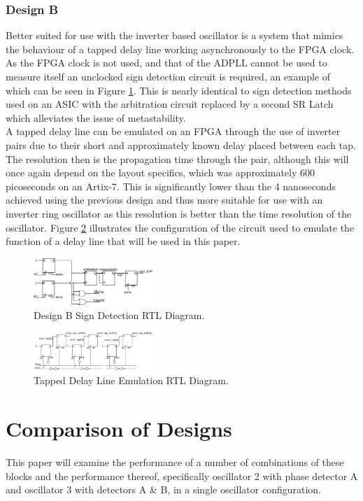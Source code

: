 \documentclass[conference]{IEEEtran}
\begin{document}
\subsubsection*{Design B}
Better suited for use with the inverter based oscillator is a system that mimics the behaviour of a tapped delay line working asynchronously to the FPGA clock. As the FPGA clock is not used, and that of the ADPLL cannot be used to measure itself an unclocked sign detection circuit is required, an example of which can be seen in Figure \ref{fig:segn_pdetdl}. This is nearly identical to sign detection methods used on an ASIC with the arbitration circuit replaced by a second SR Latch which alleviates the issue of metastability.\\
A tapped delay line can be emulated on an FPGA through the use of inverter pairs due to their short and approximately known delay placed between each tap.
The resolution then is the propagation time through the pair, although this will once again depend on the layout specifics, which was approximately 600 picoseconds on an Artix-7. This is significantly lower than the 4 nanoseconds achieved using the previous design and thus more suitable for use with an inverter ring oscillator as this resolution is better than the time resolution of the oscillator. Figure \ref{fig:num_pdetdl} illustrates the configuration of the circuit used to emulate the function of a delay line that will be used in this paper.
\begin{figure}[h]
    \centering
    \includegraphics[width=0.4\textwidth]{../new_pdet1}
    \caption{Design B Sign Detection RTL Diagram.}
    \label{fig:segn_pdetdl}
\end{figure}
\begin{figure}[h]
    \centering
    \includegraphics[width=0.4\textwidth]{../new_pdet2}
    \caption{Tapped Delay Line Emulation RTL Diagram.}
    \label{fig:num_pdetdl}
\end{figure}
\section{Comparison of Designs}
This paper will examine the performance of a number of combinations of these blocks and the performance thereof, specifically oscillator 2 with phase detector A and oscillator 3 with detectors A \& B, in a single oscillator configuration. 



 

\end{document}

